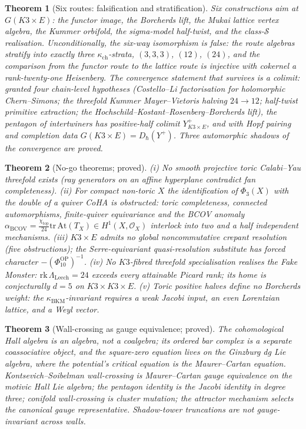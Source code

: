 \documentclass[11pt]{article}
\providecommand{\cO}{\mathcal{O}}
\providecommand{\kch}{\kappa_{\mathrm{ch}}}
\providecommand{\kBKM}{\kappa_{\mathrm{BKM}}}
\providecommand{\Phiten}{\Phi_{10}}
\newtheorem{theorem}{Theorem}[section]
\begin{document}
\begin{theorem}[Six routes: falsification and stratification]
\label{thm:sixroutes}
Six constructions aim at $G(K3\times E)$: the functor image, the
Borcherds lift, the Mukai lattice vertex algebra, the Kummer orbifold,
the sigma-model half-twist, and the class-$\mathcal S$ realisation.
Unconditionally, the six-way isomorphism is \emph{false}: the route
algebras stratify into exactly three $\kch$-strata, $(3,3,3)$, $(12)$,
$(24)$, and the comparison from the functor route to the lattice route
is injective with cokernel a rank-twenty-one Heisenberg. The
convergence statement that survives is a colimit: granted four
chain-level hypotheses \textup{(Costello--Li factorisation for
holomorphic Chern--Simons; the threefold Kummer Mayer--Vietoris
halving $24\to12$; half-twist primitive extraction; the
Hochschild--Kostant--Rosenberg--Borcherds lift)}, the pentagon of
intertwiners has positive-half colimit $Y^+_{K3\times E}$, and with
Hopf pairing and completion data $G(K3\times E)=D_\hbar(Y^+)$. Three
automorphic shadows of the convergence are proved.
\end{theorem}

\begin{theorem}[No-go theorems; proved]\label{thm:nogo}
\textup{(i)} No smooth projective toric Calabi--Yau threefold exists
\textup{(ray generators on an affine hyperplane contradict fan
completeness)}. \textup{(ii)} For compact non-toric $X$ the
identification of $\Phi_3(X)$ with the double of a quiver CoHA is
obstructed: toric completeness, connected automorphisms, finite-quiver
equivariance and the BCOV anomaly
$\alpha_{\mathrm{BCOV}}=\frac{\chi_{\mathrm{top}}}{24}
\mathrm{tr}\,\mathrm{At}(T_X)\in H^1(X,\cO_X)$ interlock into two and
a half independent mechanisms. \textup{(iii)} $K3\times E$ admits no
global noncommutative crepant resolution \textup{(five obstructions)};
the Serre-equivariant quasi-resolution substitute has forced character
$-(\Phiten^{\mathrm{OP}})^{-1}$. \textup{(iv)} No $K3$-fibred
threefold specialisation realises the Fake Monster:
$\mathrm{rk}\,\Lambda_{\mathrm{Leech}}=24$ exceeds every attainable
Picard rank; its home is conjecturally $d=5$ on $K3\times K3\times E$.
\textup{(v)} Toric positive halves define no Borcherds weight: the
$\kBKM$-invariant requires a weak Jacobi input, an even Lorentzian
lattice, and a Weyl vector.
\end{theorem}

\begin{theorem}[Wall-crossing as gauge equivalence; proved]
\label{thm:wall}
The cohomological Hall algebra is an algebra, not a coalgebra; its
ordered bar complex is a separate coassociative object, and the
square-zero equation lives on the Ginzburg dg Lie algebra, where the
potential's critical equation is the Maurer--Cartan equation.
Kontsevich--Soibelman wall-crossing is Maurer--Cartan gauge
equivalence on the motivic Hall Lie algebra; the pentagon identity is
the Jacobi identity in degree three; conifold wall-crossing is cluster
mutation; the attractor mechanism selects the canonical gauge
representative. Shadow-tower truncations are not gauge-invariant
across walls.
\end{theorem}
\end{document}
